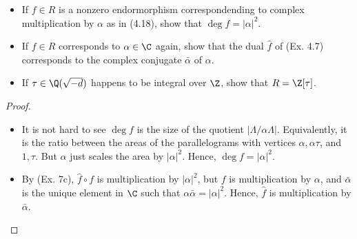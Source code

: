 \documentclass[a4paper]{article}
\begin{document}
\begin{enumerate} [label=\textbf{\arabic*.}, leftmargin=0em]
          \begin{itemize}
              \item[(a)] If $f \in R$ is a nonzero endormorphism correspondending to complex multiplication by $\alpha$ as in (4.18), show that $\deg{f} = |\alpha|^2$.
              \item[(b)] If $f \in R$ corresponds to $\alpha \in \C$ again, show that the dual $\hat{f}$ of (Ex. 4.7) corresponds to the complex conjugate $\bar{\alpha}$ of $\alpha$.
              \item[(c)] If $\tau \in \Q(\sqrt{-d})$ happens to be integral over $\Z$, show that $R = \Z[\tau]$.
          \end{itemize}

          \begin{proof} $ $ \vspace{0pt}
              \begin{itemize} [leftmargin=0cm]
                  \item[(a)] It is not hard to see $\deg{f}$ is the size of the quotient $|\Lambda / \alpha \Lambda|$.
                        Equivalently, it is the ratio between the areas of the  parallelograms with vertices $\alpha, \alpha \tau$, and $1, \tau$.
                        But $\alpha$ just scales the area by $|\alpha|^2$.
                        Hence, $\deg{f} = |\alpha|^2$.

                  \item[(b)] By (Ex. 7c), $\hat{f} \circ f$ is multiplication by $|\alpha|^2$, but $f$ is multiplication by $\alpha$, and $\bar{\alpha}$ is the unique element in $\C$ such that $\alpha \bar{\alpha} = |\alpha|^2$.
                        Hence, $\hat{f}$ is multiplication by $\bar{\alpha}$.


\end{itemize}
\end{proof}
\end{enumerate}
\end{document}
